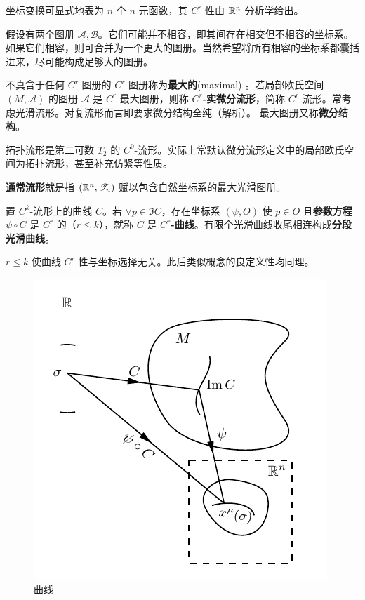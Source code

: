 \begin{remark}
    坐标变换可显式地表为 $n$ 个 $n$ 元函数，其 $C^r$ 性由 $\mathbb{R}^n$ 分析学给出。
\end{remark}

假设有两个图册 $\mathcal A,\mathcal B$。它们可能并不相容，即其间存在相交但不相容的坐标系。如果它们相容，则可合并为一个更大的图册。当然希望将所有相容的坐标系都囊括进来，尽可能构成足够大的图册。

\begin{definition}
    不真含于任何 $C^r$-图册的 $C^r$-图册称为\textbf{最大的}(maximal) 。若局部欧氏空间 $(M,\mathcal A)$ 的图册 $\mathcal A$ 是 $C^r$-最大图册，则称 \textbf{$C^r$-实微分流形}，简称 $C^r$-流形。常考虑光滑流形。对复流形而言即要求微分结构全纯（解析）。
    最大图册又称\textbf{微分结构}。
\end{definition}

\begin{remark}
    拓扑流形是第二可数 $T_2$ 的 $C^0$-流形。实际上常默认微分流形定义中的局部欧氏空间为拓扑流形，甚至补充仿紧等性质。
\end{remark}

\begin{eg}
    \textbf{通常流形}就是指 $(\mathbb{R}^n,\mathscr T_u)$ 赋以包含自然坐标系的最大光滑图册。
\end{eg}

\begin{definition}
    置 $C^k$-流形上的曲线 $C$。若 $\forall p\in \Im C$，存在坐标系 $(\psi,O)$ 使 $p\in O$ 且\textbf{参数方程} $\psi\circ C$ 是 $C^r$ 的（$r\leqslant k$），就称 $C$ 是 $C^r$\textbf{-曲线}。有限个光滑曲线收尾相连构成\textbf{分段光滑曲线}。
\end{definition}

\begin{remark}
    $r\leqslant k$ 使曲线 $C^r$ 性与坐标选择无关。此后类似概念的良定义性均同理。
\end{remark}

\begin{figure}[ht]
    \centering
    \includegraphics[width=.4\textwidth]{fig/appx/curve.pdf}
    \caption{曲线}
\end{figure}

